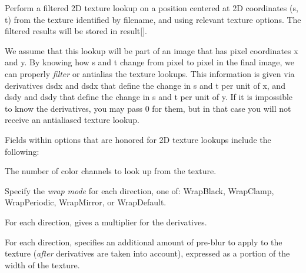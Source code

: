 
Perform a filtered 2D texture lookup on a position centered at 2D
coordinates ({\cf s}, {\cf t}) from the texture identified by
{\cf filename}, and using relevant texture {\cf options}.  The filtered
results will be stored in {\cf result[]}.

We assume that this lookup will be part of an image that has pixel
coordinates {\cf x} and {\cf y}.  By knowing how {\cf s} and {\cf t}
change from pixel to pixel in the final image, we can properly
\emph{filter} or antialias the texture lookups.  This information is
given via derivatives {\cf dsdx} and {\cf dsdx} that define the change
in {\cf s} and {\cf t} per unit of {\cf x}, and {\cf dsdy} and {\cf
  dsdy} that define the change in {\cf s} and {\cf t} per unit of {\cf
  y}.  If it is impossible to know the derivatives, you may pass 0 for
them, but in that case you will not receive an antialiased texture lookup.

Fields within {\cf options} that are honored for 2D texture lookups
include the following:

\vspace{-12pt}
\vspace{10pt}
The number of color channels to look up from the texture.
\apiend

\vspace{-24pt}
\vspace{10pt}
Specify the \emph{wrap mode} for each direction, one of: 
{\cf WrapBlack}, {\cf WrapClamp}, {\cf WrapPeriodic}, {\cf WrapMirror},
or {\cf WrapDefault}.
\apiend

\vspace{-24pt}
\vspace{10pt}
For each direction, gives a multiplier for the derivatives.
\apiend

\vspace{-24pt}
\vspace{10pt}
For each direction, specifies an additional amount of pre-blur to apply
to the texture (\emph{after} derivatives are taken into account),
expressed as a portion of the width of the texture.
\apiend


